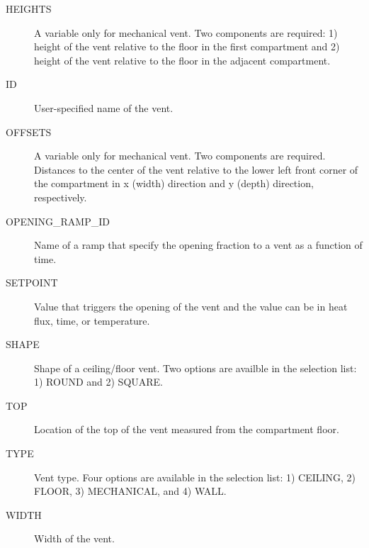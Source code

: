 \begin{adjustwidth}{1cm}{0cm}
\begin{description}
  \item[HEIGHTS] A variable only for mechanical vent. Two components are required: 1) height of the vent relative to the floor in the first compartment and 2) height of the vent relative to the floor in the adjacent compartment.
  \item[ID] User-specified name of the vent.
  \item[OFFSETS] A variable only for mechanical vent. Two components are required. Distances to the center of the vent relative to the lower left front corner of the compartment in x (width) direction and y (depth) direction, respectively.
  \item[OPENING\_RAMP\_ID] Name of a ramp that specify the opening fraction to a vent as a function of time.
  \item[SETPOINT] Value that triggers the opening of the vent and the value can be in heat flux, time, or temperature.
  \item[SHAPE] Shape of a ceiling/floor vent. Two options are availble in the selection list: 1) ROUND and 2) SQUARE.
  \item[TOP] Location of the top of the vent measured from the compartment floor.
  \item[TYPE] Vent type. Four options are available in the selection list: 1) CEILING, 2) FLOOR, 3) MECHANICAL, and 4) WALL.
  \item[WIDTH] Width of the vent.
\end{description}
\end{adjustwidth}

\vspace{\baselineskip}


